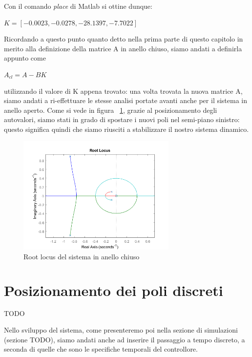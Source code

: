 Con il comando \textit{place} di Matlab si ottine dunque:
\begin{center}
	
	$	K =[  -0.0023  , -0.0278, -28.1397  , -7.7022]$
	
\end{center}

Ricordando a questo punto quanto detto nella prima parte di questo capitolo in merito alla definizione della matrice A in anello chiuso, siamo andati a definirla appunto come

\begin{center}
	$
	A_{cl} =A-BK
	$
\end{center}

utilizzando il valore di K appena trovato: una volta trovata la nuova matrice A, siamo andati a ri-effettuare le stesse analisi portate avanti anche per il sistema in anello aperto.
Come si vede in figura ~\ref{fig:closed_loop_root}, grazie al posizionamento degli autovalori, siamo stati in grado di spostare i nuovi poli nel semi-piano sinistro: questo significa quindi che siamo riusciti a stabilizzare il nostro sistema dinamico.
\begin{figure}[H]
	\centering   	
	\includegraphics[width=0.7\textwidth]{Immagini/root_locus_closed_loop.png}
	\caption{Root locus del sistema in anello chiuso}
	\label{fig:closed_loop_root}
\end{figure}

\section{Posizionamento dei poli discreti}
TODO

Nello sviluppo del sistema, come presenteremo poi nella sezione di simulazioni (sezione TODO), siamo andati anche ad inserire il passaggio a tempo discreto, a seconda di quelle che sono le specifiche temporali del controllore.

